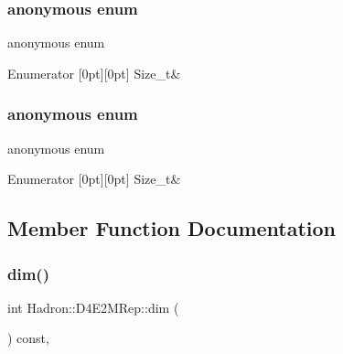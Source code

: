 \subsubsection{\texorpdfstring{anonymous enum}{anonymous enum}}
{\footnotesize\ttfamily anonymous enum}

\begin{DoxyEnumFields}{Enumerator}
[0pt][0pt]{}\mbox{\label{structHadron_1_1D4E2MRep_a62e362756a5b07d4d8ae07cd56fc585aae977a2368f7348e3cbe74d7c5b616551}} 
Size\+\_\+t&\\
\hline

\end{DoxyEnumFields}
\mbox{\label{structHadron_1_1D4E2MRep_a62e362756a5b07d4d8ae07cd56fc585a}} 
\subsubsection{\texorpdfstring{anonymous enum}{anonymous enum}}
{\footnotesize\ttfamily anonymous enum}

\begin{DoxyEnumFields}{Enumerator}
[0pt][0pt]{}\mbox{\label{structHadron_1_1D4E2MRep_a62e362756a5b07d4d8ae07cd56fc585aae977a2368f7348e3cbe74d7c5b616551}} 
Size\+\_\+t&\\
\hline

\end{DoxyEnumFields}


\subsection{Member Function Documentation}
\mbox{\label{structHadron_1_1D4E2MRep_a278a8c15aa90f5ca19d3ed547d94ed45}} 
\subsubsection{\texorpdfstring{dim()}{dim()}\hspace{0.1cm}{\footnotesize\ttfamily [1/2]}}
{\footnotesize\ttfamily int Hadron\+::\+D4\+E2\+M\+Rep\+::dim (\begin{DoxyParamCaption}{ }\end{DoxyParamCaption}) const\hspace{0.3cm}{\ttfamily [inline]}, {\ttfamily [virtual]}}


